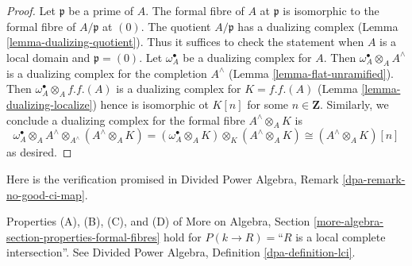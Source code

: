 \begin{proof}
Let $\mathfrak p$ be a prime of $A$. The formal fibre of $A$ at $\mathfrak p$
is isomorphic to the formal fibre of $A/\mathfrak p$ at $(0)$. The quotient
$A/\mathfrak p$ has a dualizing complex
(Lemma \ref{lemma-dualizing-quotient}). Thus it suffices to check the statement
when $A$ is a local domain and $\mathfrak p = (0)$.
Let $\omega_A^\bullet$ be a dualizing complex for $A$. Then
$\omega_A^\bullet \otimes_A A^\wedge$ is a dualizing complex
for the completion $A^\wedge$ (Lemma \ref{lemma-flat-unramified}).
Then $\omega_A^\bullet \otimes_A f.f.(A)$ is a dualizing
complex for $K = f.f.(A)$ (Lemma \ref{lemma-dualizing-localize})
hence is isomorphic ot $K[n]$ for some $n \in \mathbf{Z}$.
Similarly, we conclude a dualizing complex for the formal fibre
$A^\wedge \otimes_A K$ is
$$
\omega_A^\bullet \otimes_A A^\wedge \otimes_{A^\wedge} (A^\wedge \otimes_A K) =
(\omega_A^\bullet \otimes_A K) \otimes_K (A^\wedge \otimes_A K) \cong
(A^\wedge \otimes_A K)[n]
$$
as desired.
\end{proof}

\noindent
Here is the verification promised in
Divided Power Algebra, Remark \ref{dpa-remark-no-good-ci-map}.

\begin{lemma}
\label{lemma-formal-fibres-lci}
Properties (A), (B), (C), and (D) of
More on Algebra, Section \ref{more-algebra-section-properties-formal-fibres}
hold for $P(k \to R) =$``$R$ is a local complete intersection''.
See Divided Power Algebra, Definition \ref{dpa-definition-lci}.
\end{lemma}

